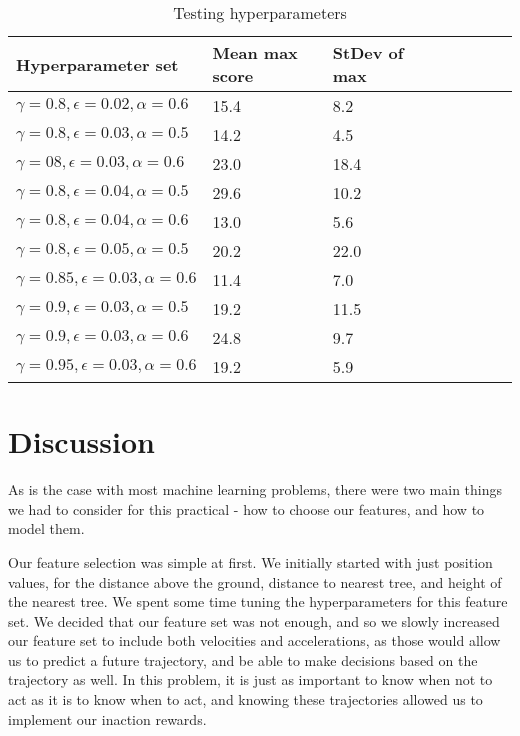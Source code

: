 \documentclass[11pt]{article}
\begin{document}
\begin{table}[!htbp]
\centering
\begin{tabular}{|l|l|l|l|l|l|l|l|}
 \toprule
 \textbf{Hyperparameter set} &  \textbf{Mean max score} &  \textbf{StDev of max} \\
 \midrule
\textsc{$\gamma=0.8,\epsilon=0.02,\alpha=0.6$}& 15.4 & 8.2 \\
\textsc{$\gamma=0.8,\epsilon=0.03,\alpha=0.5$}& 14.2 & 4.5 \\
\textsc{$\gamma=08,\epsilon=0.03,\alpha=0.6$}& 23.0 & 18.4 \\
\textsc{$\gamma=0.8,\epsilon=0.04,\alpha=0.5$}& 29.6 & 10.2 \\
\textsc{$\gamma=0.8,\epsilon=0.04,\alpha=0.6$}& 13.0 & 5.6 \\
\textsc{$\gamma=0.8,\epsilon=0.05,\alpha=0.5$}& 20.2 & 22.0 \\
\textsc{$\gamma=0.85,\epsilon=0.03,\alpha=0.6$}& 11.4 & 7.0 \\
\textsc{$\gamma=0.9,\epsilon=0.03,\alpha=0.5$}& 19.2 & 11.5   \\
\textsc{$\gamma=0.9,\epsilon=0.03,\alpha=0.6$}& 24.8 & 9.7 \\
\textsc{$\gamma=0.95,\epsilon=0.03,\alpha=0.6$}& 19.2 & 5.9 \\
 \bottomrule
\end{tabular}
\caption{\label{bot} Testing hyperparameters}
\end{table}

\section{Discussion} 
As is the case with most machine learning problems, there were two main things we had to consider for this practical - how to choose our features, and how to model them. 

Our feature selection was simple at first. We initially started with just position values, for the distance above the ground, distance to nearest tree, and height of the nearest tree. We spent some time tuning the hyperparameters for this feature set. We decided that our feature set was not enough, and so we slowly increased our feature set to include both velocities and accelerations, as those would allow us to predict a future trajectory, and be able to make decisions based on the trajectory as well. In this problem, it is just as important to know when not to act as it is to know when to act, and knowing these trajectories allowed us to implement our inaction rewards.   
\end{document}
